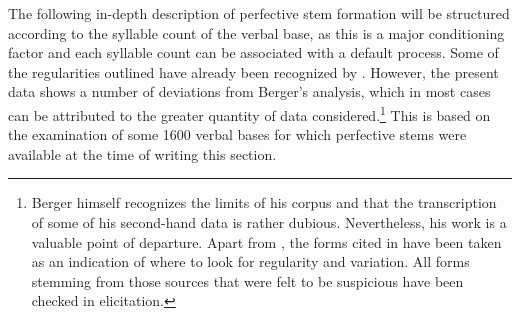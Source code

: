 The following in-depth description of perfective stem formation will be structured according to the syllable count of the verbal base, as this is a major conditioning factor and each syllable count can be associated with a default process. Some of the regularities outlined have already been recognized by \citet{BergerP1938}. However, the present data shows a number of deviations from Berger's analysis, which in most cases can be attributed to the greater quantity of data considered.\footnote{Berger himself recognizes the limits of his corpus and that the transcription of some of his second-hand data is rather dubious. Nevertheless, his work is a valuable point of departure. Apart from \citet{BergerP1938}, the forms cited in \citet{FelbergK1996} have been taken as an indication of where to look for regularity and variation. All forms stemming from those sources that were felt to be suspicious have been checked in elicitation.} This is based on the examination of some 1600 verbal bases for which perfective stems were available at the time of writing this section.

